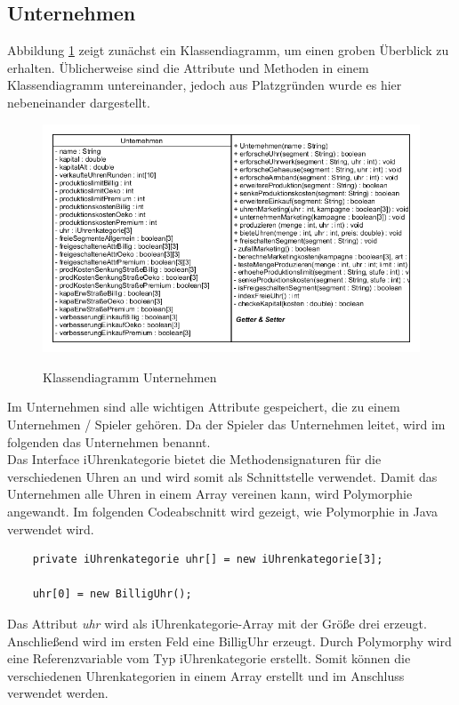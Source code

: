 \newpage
\subsection{Unternehmen}
Abbildung \ref{fig:KlassUnternehmen} zeigt zunächst ein Klassendiagramm, um einen groben Überblick zu erhalten. Üblicherweise sind die Attribute und Methoden in einem Klassendiagramm untereinander, jedoch aus Platzgründen wurde es hier nebeneinander dargestellt.
\begin{figure} [h]
	\centering
	\includegraphics[scale=0.6]{img/Unternehmen.png} 
	\label{fig:KlassUnternehmen}
	\caption{Klassendiagramm Unternehmen}
\end{figure}

Im Unternehmen sind alle wichtigen Attribute gespeichert, die zu einem Unternehmen / Spieler gehören. Da der Spieler das Unternehmen leitet, wird im folgenden das Unternehmen benannt. \\

Das Interface iUhrenkategorie bietet die Methodensignaturen für die verschiedenen Uhren an und wird somit als Schnittstelle verwendet. Damit das Unternehmen alle Uhren in einem Array vereinen kann, wird Polymorphie angewandt. Im folgenden Codeabschnitt wird gezeigt, wie Polymorphie in Java verwendet wird. \\

\lstset{language=Java} 
\begin{lstlisting}
	private iUhrenkategorie uhr[] = new iUhrenkategorie[3];
	
	uhr[0] = new BilligUhr();
\end{lstlisting}
Das Attribut \textit{uhr} wird als iUhrenkategorie-Array mit der Größe drei erzeugt. Anschließend wird im ersten Feld eine BilligUhr erzeugt. Durch Polymorphy wird eine Referenzvariable vom Typ iUhrenkategorie erstellt. Somit können die verschiedenen Uhrenkategorien in einem Array erstellt und im Anschluss verwendet werden. 

